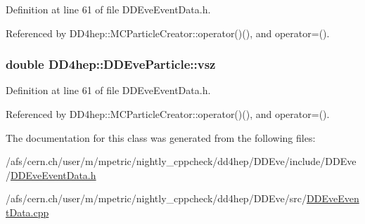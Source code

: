 Definition at line 61 of file DDEveEventData.h.

Referenced by DD4hep::MCParticleCreator::operator()(), and operator=().\hypertarget{class_d_d4hep_1_1_d_d_eve_particle_a8b93479f6e6812a6902a8574fce930e9}{
\subsubsection[{vsz}]{\setlength{\rightskip}{0pt plus 5cm}double {\bf DD4hep::DDEveParticle::vsz}}}
\label{class_d_d4hep_1_1_d_d_eve_particle_a8b93479f6e6812a6902a8574fce930e9}


Definition at line 61 of file DDEveEventData.h.

Referenced by DD4hep::MCParticleCreator::operator()(), and operator=().

The documentation for this class was generated from the following files:\begin{DoxyCompactItemize}
\item 
/afs/cern.ch/user/m/mpetric/nightly\_\-cppcheck/dd4hep/DDEve/include/DDEve/\hyperlink{_d_d_eve_event_data_8h}{DDEveEventData.h}\item 
/afs/cern.ch/user/m/mpetric/nightly\_\-cppcheck/dd4hep/DDEve/src/\hyperlink{_d_d_eve_event_data_8cpp}{DDEveEventData.cpp}\end{DoxyCompactItemize}
